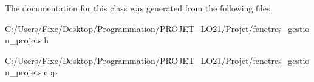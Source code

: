 The documentation for this class was generated from the following files\+:\begin{DoxyCompactItemize}
\item 
C\+:/\+Users/\+Fixe/\+Desktop/\+Programmation/\+P\+R\+O\+J\+E\+T\+\_\+\+L\+O21/\+Projet/fenetres\+\_\+gestion\+\_\+projets.\+h\item 
C\+:/\+Users/\+Fixe/\+Desktop/\+Programmation/\+P\+R\+O\+J\+E\+T\+\_\+\+L\+O21/\+Projet/fenetres\+\_\+gestion\+\_\+projets.\+cpp\end{DoxyCompactItemize}
